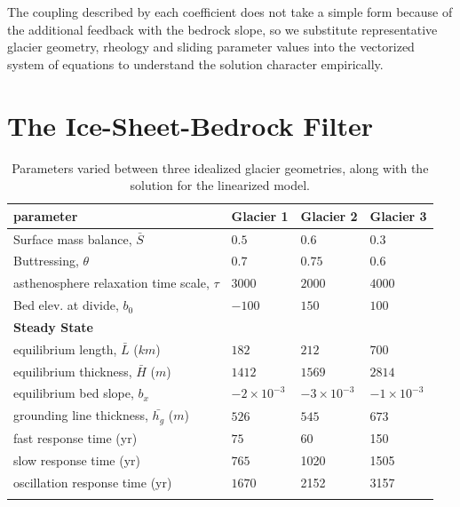 \documentclass[tc, manuscript]{copernicus}
\begin{document}



The coupling described by each coefficient does not take a simple form because of the additional feedback with the bedrock slope, so we substitute representative glacier geometry, rheology and sliding parameter values into the vectorized system of equations to understand the solution character empirically. 


\section{The Ice-Sheet-Bedrock Filter}


\begin{table}[h]
    \begin{tabular}{llll}
        \hline
        \bf{parameter} & \bf{Glacier 1} & \bf{Glacier 2} & \bf{Glacier 3} \\
        \hline
        Surface mass balance, $\bar{S}$ & $0.5$ & $0.6$ & $0.3$ \\
        Buttressing, $\theta$ & $0.7$ &  $0.75$ & $0.6$ \\
        asthenosphere relaxation time scale, $\tau$ & $3000$ & $2000$ & $4000$ \\
        Bed elev. at divide, $b_0$ & $-100$ & $150$ & $100$  \\
        \hline
        \bf{Steady State} \\
        \hline
        equilibrium length, $\bar{L}$ ($km$) &  $182$  & $212$ & $700$ \\
        equilibrium thickness, $\bar{H}$ ($m$) & $1412$ & $1569$ & $2814$ \\
         equilibrium bed slope, $b_x$ & $-2 \times 10^{-3}$ & $-3 \times 10^{-3}$ & $-1 \times 10^{-3}$ \\
        grounding line thickness, $\bar{h_g}$ ($m$) & $526$ & $545$ & $673$ \\
        fast response time (yr) & $75$ & 60 & 150 \\
        slow response time (yr) & $765$ & 1020 & 1505 \\
        oscillation response time (yr) & $1670$ & 2152 & 3157 \\
        \hline
        \\
        
    \end{tabular}
    
    \caption{Parameters varied between three idealized glacier geometries, along with the solution for the linearized model.}
\end{table}
\end{document}
